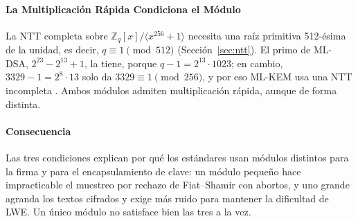 \paragraph{La Multiplicación Rápida Condiciona el Módulo}
La NTT completa sobre $\mathbb{Z}_q[x]/\langle x^{256}+1\rangle$ necesita una raíz primitiva 512-ésima de la unidad, es decir, $q \equiv 1 \pmod{512}$ (Sección~\ref{sec:ntt}). El primo de ML-DSA, $2^{23} - 2^{13} + 1$, la tiene, porque $q - 1 = 2^{13} \cdot 1023$; en cambio, $3329 - 1 = 2^{8} \cdot 13$ solo da $3329 \equiv 1 \pmod{256}$, y por eso ML-KEM usa una NTT incompleta \cite{nist2024fips203, nist2024fips204}. Ambos módulos admiten multiplicación rápida, aunque de forma distinta.

\paragraph{Consecuencia}
Las tres condiciones explican por qué los estándares usan módulos distintos para la firma y para el encapsulamiento de clave: un módulo pequeño hace impracticable el muestreo por rechazo de Fiat--Shamir con abortos, y uno grande agranda los textos cifrados y exige más ruido para mantener la dificultad de LWE. Un único módulo no satisface bien las tres a la vez.
